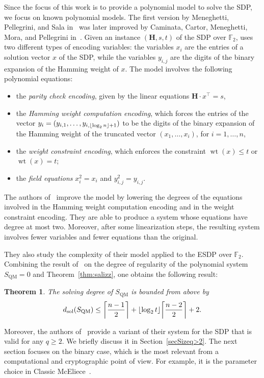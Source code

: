 \documentclass[11pt]{article}
\newcommand{\F}[0]{\mathbb{F}}
\DeclarePairedDelimiter{\fl}{\lfloor}{\rfloor}
\DeclarePairedDelimiter{\cl}{\lceil}{\rceil}
\theoremstyle{plain}
\newtheorem{theo}{Theorem}[section]
\theoremstyle{definition}
\theoremstyle{remark}
\begin{document}
Since the focus of this work is to provide a polynomial model to solve the SDP, we focus on known polynomial models. The first version by Meneghetti, Pellegrini, and Sala in~\cite{MPSmodels} was later improved by Caminata, Cartor, Meneghetti, Mora, and Pellegrini in~\cite{caminata2025quadraticmodelingssyndromedecoding}. Given an instance $(\mathbf{H},s,t)$ of the SDP over $\F_2$, \cite{MPSmodels} uses two different types of encoding variables: the variables $x_i$ are the entries of a solution vector $x$ of the SDP, while the variables $y_{i,j}$ are the digits of the binary expansion of the Hamming weight of $x$. The model involves the following polynomial equations:
\begin{itemize}
    \item the \textit{parity check encoding}, given by the linear equations $\mathbf{H}\cdot x^\top=s$,
    \item the \textit{Hamming weight computation encoding}, which forces the entries of the vector $y_i=(y_{i,1},\dots,y_{i,\fl*{\operatorname{log}_2 n}+1})$ to be the digits of the binary expansion of the Hamming weight of the truncated vector $(x_1,\dots,x_i)$, for $i=1,\dots,n$,
    \item the \textit{weight constraint encoding}, which enforces the constraint $\operatorname{wt}(x)\leq t$ or $\operatorname{wt}(x)=t$; 
    \item the \textit{field equations} $x_i^2=x_i$ and $y_{i,j}^2=y_{i,j}$.
\end{itemize}
The authors of~\cite{caminata2025quadraticmodelingssyndromedecoding} improve the model by lowering the degrees of the equations involved in the Hamming weight computation encoding and in the weight constraint encoding. They are able to produce a system whose equations have degree at most two. Moreover, after some linearization steps, the resulting system involves fewer variables and fewer equations than the original.

They also study the complexity of their model applied to the ESDP over $\F_2$. Combining the result of~\cite[Remark 8]{caminata2025quadraticmodelingssyndromedecoding} on the degree of regularity of the polynomial system $S_{\operatorname{QM}}=0$ %
and Theorem~\ref{thm:salizz}, one obtains the following result:
\begin{theo}\label{teoSQM}
    The solving degree of $S_{\operatorname{QM}}$ is bounded from above by
    \begin{equation*}
        d_{\operatorname{sol}}(S_{\operatorname{QM}})\leq\cl*{\frac{n-1}{2}}+\fl*{\operatorname{log}_2t}\cl*{\frac{n-2}{2}}+2.
    \end{equation*}
\end{theo}
Moreover, the authors of~\cite{caminata2025quadraticmodelingssyndromedecoding} provide a variant of their system for the SDP that is valid for any $q\geq 2$. We briefly discuss it in Section~\ref{secSizeq>2}. The next section focuses on the binary case, which is the most relevant from a computational and cryptographic point of view. For example, it is the parameter choice in Classic McEliece~\cite{ClassicMcEliece2022}.
\end{document}
